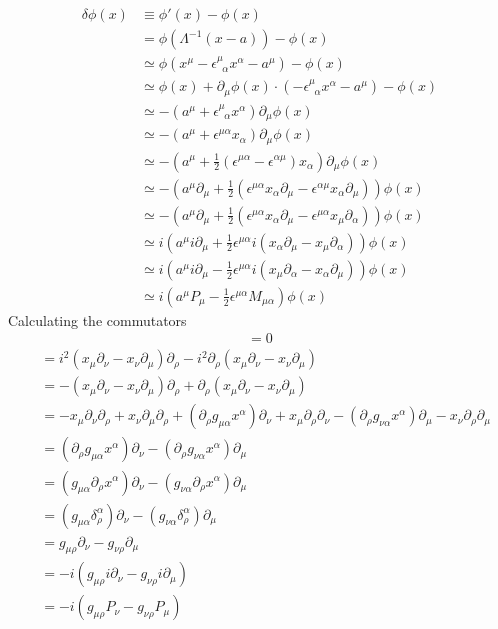 \documentclass[10pt,a4paper]{article}
\theoremstyle{definition}
\begin{document}
\begin{align}
\delta\phi(x)
&\equiv\phi'(x)-\phi(x)\\
&=\phi(\Lambda^{-1}(x-a))-\phi(x)\\
&\simeq\phi(x^\mu-\epsilon^\mu_{\;\;\alpha}x^\alpha-a^\mu)-\phi(x)\\
&\simeq\phi(x)+\partial_\mu\phi(x)\cdot(-\epsilon^\mu_{\;\;\alpha}x^\alpha-a^\mu)-\phi(x)\\
&\simeq-(a^\mu+\epsilon^\mu_{\;\;\alpha}x^\alpha)\partial_\mu\phi(x)\\
&\simeq-(a^\mu+\epsilon^{\mu\alpha}x_\alpha)\partial_\mu\phi(x)\\
&\simeq-\left(a^\mu+\frac{1}{2}\left(\epsilon^{\mu\alpha}-\epsilon^{\alpha\mu}\right)x_\alpha\right)\partial_\mu\phi(x)\\
&\simeq-\left(a^\mu\partial_\mu+\frac{1}{2}\left(\epsilon^{\mu\alpha}x_\alpha\partial_\mu-\epsilon^{\alpha\mu}x_\alpha\partial_\mu\right)\right)\phi(x)\\
&\simeq-\left(a^\mu\partial_\mu+\frac{1}{2}\left(\epsilon^{\mu\alpha}x_\alpha\partial_\mu-\epsilon^{\mu\alpha}x_\mu\partial_\alpha\right)\right)\phi(x)\\
&\simeq i\left(a^\mu i\partial_\mu+\frac{1}{2}\epsilon^{\mu\alpha}i\left(x_\alpha\partial_\mu-x_\mu\partial_\alpha\right)\right)\phi(x)\\
&\simeq i\left(a^\mu i\partial_\mu-\frac{1}{2}\epsilon^{\mu\alpha}i\left(x_\mu\partial_\alpha-x_\alpha\partial_\mu\right)\right)\phi(x)\\
&\simeq i\left(a^\mu P_\mu-\frac{1}{2}\epsilon^{\mu\alpha}M_{\mu\alpha}\right)\phi(x)
\end{align}
Calculating the commutators
\begin{align}
[P_\mu,P_\nu]=0
\end{align}
\begin{align}
[M_{\mu\nu},P_\rho]
&=i^2(x_\mu\partial_\nu-x_\nu\partial_\mu)\partial_\rho-i^2\partial_\rho(x_\mu\partial_\nu-x_\nu\partial_\mu)\\
&=-(x_\mu\partial_\nu-x_\nu\partial_\mu)\partial_\rho+\partial_\rho(x_\mu\partial_\nu-x_\nu\partial_\mu)\\
&=-x_\mu\partial_\nu\partial_\rho+x_\nu\partial_\mu\partial_\rho+ (\partial_\rho g_{\mu\alpha}x^\alpha)\partial_\nu+x_\mu\partial_\rho\partial_\nu
-(\partial_\rho g_{\nu\alpha}x^\alpha)\partial_\mu-x_\nu\partial_\rho\partial_\mu\\
&=(\partial_\rho g_{\mu\alpha}x^\alpha)\partial_\nu
-(\partial_\rho g_{\nu\alpha}x^\alpha)\partial_\mu\\
&=(g_{\mu\alpha}\partial_\rho x^\alpha)\partial_\nu
-(g_{\nu\alpha}\partial_\rho x^\alpha)\partial_\mu\\
&=(g_{\mu\alpha}\delta^\alpha_\rho)\partial_\nu
-(g_{\nu\alpha}\delta^\alpha_\rho)\partial_\mu\\
&=g_{\mu\rho}\partial_\nu
-g_{\nu\rho}\partial_\mu\\
&=-i(g_{\mu\rho}i\partial_\nu
-g_{\nu\rho}i\partial_\mu)\\
&=-i(g_{\mu\rho}P_\nu
-g_{\nu\rho}P_\mu)
\end{align}
\end{document}
